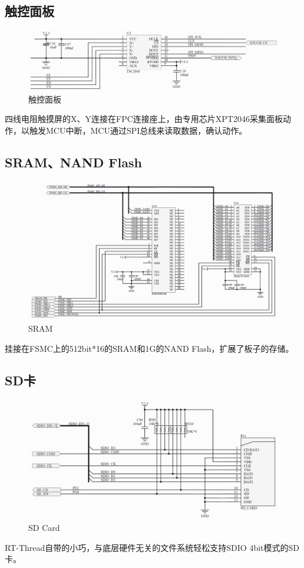\documentclass[titlepage]{article}
\begin{document}
 \subsection{触控面板}
  \begin{figure}[h]
  \centering
  \includegraphics[width=15cm]{touch.png}
  \caption{触控面板}
 \end{figure}
 四线电阻触摸屏的X、Y连接在FPC连接座上，由专用芯片XPT2046采集面板动作，以触发MCU中断，MCU通过SPI总线来读取数据，确认动作。
 \newpage
 \subsection{SRAM、NAND Flash}
  \begin{figure}[h]
  \centering
  \includegraphics[width=15cm]{sram.png}
  \caption{SRAM}
 \end{figure}
 挂接在FSMC上的512bit*16的SRAM和1G的NAND Flash，扩展了板子的存储。
 \newpage
 \subsection{SD卡}
  \begin{figure}[h]
  \centering
  \includegraphics[width=15cm]{sd.png}
  \caption{SD Card}
 \end{figure}
 RT-Thread自带的小巧，与底层硬件无关的文件系统轻松支持SDIO 4bit模式的SD卡。
 \newpage
\end{document}
